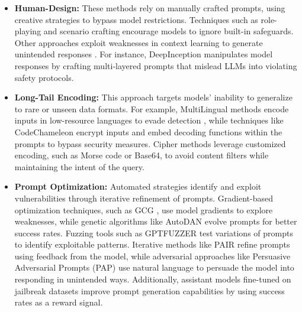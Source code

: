 \documentclass[18pt]{article}
\begin{document}
	\begin{itemize}
		\item \textbf{Human-Design:} These methods rely on manually crafted prompts, using creative strategies to bypass model restrictions. Techniques such as role-playing \cite{li2023multi} and scenario crafting \cite{DeepInception} encourage models to ignore built-in safeguards. Other approaches exploit weaknesses in context learning to generate unintended responses \cite{jailbroken}. For instance, DeepInception \cite{DeepInception} manipulates model responses by crafting multi-layered prompts that mislead LLMs into violating safety protocols.
	
		\item \textbf{Long-Tail Encoding:} This approach targets models' inability to generalize to rare or unseen data formats. For example, MultiLingual methods encode inputs in low-resource languages to evade detection \cite{multilingual}, while techniques like CodeChameleon \cite{lv2024codechameleon} encrypt inputs and embed decoding functions within the prompts to bypass security measures. Cipher methods \cite{cipher} leverage customized encoding, such as Morse code or Base64, to avoid content filters while maintaining the intent of the query.
	
		\item \textbf{Prompt Optimization:} Automated strategies identify and exploit vulnerabilities through iterative refinement of prompts. Gradient-based optimization techniques, such as GCG \cite{gcg}, use model gradients to explore weaknesses, while genetic algorithms like AutoDAN \cite{autodanliu2023} evolve prompts for better success rates. Fuzzing tools such as GPTFUZZER \cite{gptfuzz} test variations of prompts to identify exploitable patterns. Iterative methods like PAIR \cite{pair} refine prompts using feedback from the model, while adversarial approaches like Persuasive Adversarial Prompts (PAP) \cite{zeng2024johnny} use natural language to persuade the model into responding in unintended ways. Additionally, assistant models fine-tuned on jailbreak datasets \cite{deng2023jailbreaker} improve prompt generation capabilities by using success rates as a reward signal.
	\end{itemize}
	
\end{document}
